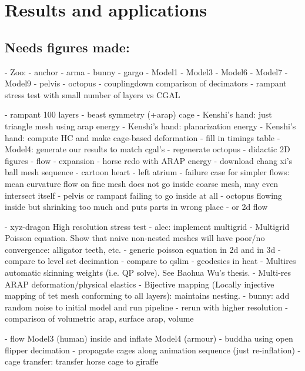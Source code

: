 
\section{Results and applications}
\label{sec:results}

\subsection{Needs figures made:}
- Zoo:
  - anchor
  - arma
  - bunny
  - gargo
  - Model1
  - Model3
  - Model6
  - Model7
  - Model9
  - pelvis
  - octopus
- couplingdown comparison of decimators
- rampant stress test with small number of layers vs CGAL
 

- rampant 100 layers
- beast symmetry (+arap) cage
- Kenshi's hand: just triangle mesh using arap energy
- Kenshi's hand: planarization energy 
- Kenshi's hand: compute HC and make cage-based deformation
- fill in timings table
- Model4: generate our results to match cgal's
- regenerate octopus
- didactic 2D figures
  - flow
  - expansion
- horse redo with ARAP energy
- download chang xi's ball mesh sequence
- cartoon heart
- left atrium
- failure case for simpler flows: mean curvature flow on fine mesh does not
  go inside coarse mesh, may even intersect itself
    - pelvis or rampant failing to go inside at all
    - octopus flowing inside but shrinking too much and puts parts in wrong
      place
    - or 2d flow

- xyz-dragon High resolution stress test
- alec: implement multigrid
  - Multigrid Poisson equation. Show that naive non-nested meshes will have
    poor/no convergence: alligator teeth, etc.
      - generic poisson equation in 2d and in 3d
        - compare to level set decimation
        - compare to qslim
      - geodesics in heat 
  - Multires automatic skinning weights (i.e. QP solve). See Baohua Wu's thesis.
  - Multi-res ARAP deformation/physical elastics
  - Bijective mapping (Locally injective mapping of tet mesh conforming to all
    layers): maintains nesting.
- bunny: add random noise to initial model and run pipeline
  - rerun with higher resolution
- comparison of volumetric arap, surface arap, volume

- flow Model3 (human) inside and inflate Model4 (armour)
- buddha using open flipper decimation
- propagate cages along animation sequence (just re-inflation)
- cage transfer: transfer horse cage to giraffe

